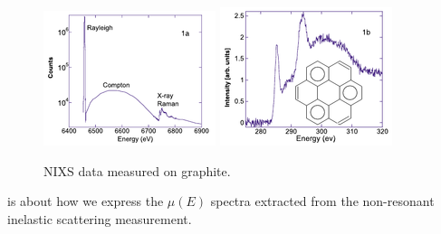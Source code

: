\documentclass{article}
\begin{document}
\begin{figure}[h]
  \centering
  \includegraphics[width=0.2\linewidth]{nixs.png}
  \includegraphics[width=0.2\linewidth]{xels.png}
  \caption{NIXS data measured on graphite.}
  \label{fig:nixs}
\end{figure}

{\xdi} is about how we express the $\mu(E)$ spectra extracted from the
non-resonant inelastic scattering measurement.
\end{document}
